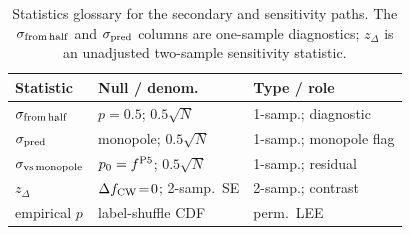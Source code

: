 \documentclass[aps,prd,twocolumn,superscriptaddress,showpacs,preprintnumbers,nofootinbib,longbibliography,floatfix]{revtex4-2}
\begin{document}
\begin{table}[ht]
\caption{Statistics glossary for the secondary and sensitivity paths.
The $\sigma_{\rm from\,half}$ and $\sigma_{\rm pred}$ columns are
one-sample diagnostics; $z_\Delta$ is an unadjusted two-sample
sensitivity statistic.}
\label{tab:stats_glossary}
{\small
\begin{ruledtabular}
\begin{tabular}{lll}
Statistic & Null / denom.\ & Type / role \\
\hline
$\sigma_{\rm from\,half}$ & $p=0.5$; $0.5\sqrt{N}$ & 1-samp.; diagnostic \\
$\sigma_{\rm pred}$ & monopole; $0.5\sqrt{N}$ & 1-samp.; monopole flag \\
$\sigma_{\rm vs\,monopole}$ & $p_0=f^{\rm P5}$; $0.5\sqrt{N}$ & 1-samp.; residual \\
$z_\Delta$ & $\Delta f_{\rm CW}\!=\!0$; 2-samp.\ SE & 2-samp.; contrast \\
empirical $p$ & label-shuffle CDF & perm.\ LEE \\
\end{tabular}
\end{ruledtabular}
}
\end{table}
\end{document}
